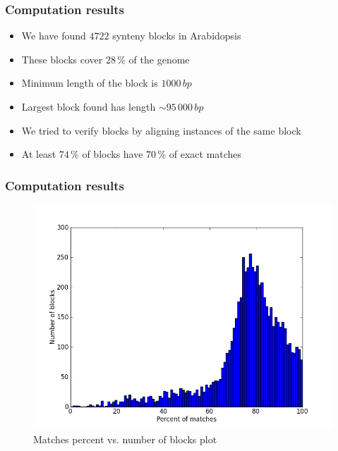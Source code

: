 \documentclass[svgnames,14pt]{beamer}
\begin{document}
\begin{frame}
\frametitle{Computation results}
\begin{itemize}
\item We have found \(4722\) synteny blocks in Arabidopsis
\item These blocks cover \(28 \, \%\) of the genome
\item Minimum length of the block is \(1000 \, bp\)
\item Largest block found has length \(\sim 95 \, 000 \, bp\)
\item We tried to verify blocks by aligning instances of the same block
\item At least \(74 \, \%\) of blocks have \(70 \, \%\) of exact matches
\end{itemize}
\end{frame}

\begin{frame}
\frametitle{Computation results}
\begin{figure}
\centering
\includegraphics[scale = 0.480]{blocks_alignments.png}
\small \caption{Matches percent vs. number of blocks plot}
\end{figure}
\end{frame}
\end{document}

